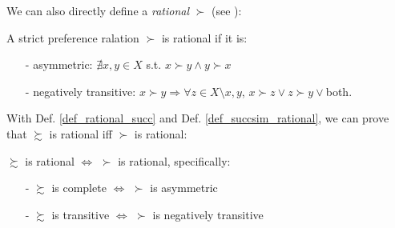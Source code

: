 We can also directly define a \textit{rational} $\succ$ (see \citet[Page 19-21]{kreps1990acourse}):
\begin{definition}\label{def_rational_succ}
    A strict preference ralation $\succ$ is rational if it is:
    \begin{enumerate}
        \item[-] asymmetric: $\nexists x,y\in X$ s.t. $x\succ y \land y\succ x$
        \item[-] negatively transitive: $x\succ y \Rightarrow \forall z\in X\setminus{x,y}$, $x\succ z\lor z\succ y \lor$both. 
    \end{enumerate}
\end{definition}

With Def. \ref{def_rational_succ} and Def. \ref{def_succsim_rational}, we can prove that $\succsim$ is rational iff $\succ$ is rational:
\begin{theorem}
    $\succsim$ is rational $\Leftrightarrow$ $\succ$ is rational, specifically:
    \begin{enumerate}
        \item[-] $\succsim$ is complete $\Leftrightarrow$ $\succ$ is asymmetric
        \item[-] $\succsim$ is transitive $\Leftrightarrow$ $\succ$ is negatively transitive
    \end{enumerate}
\end{theorem}

